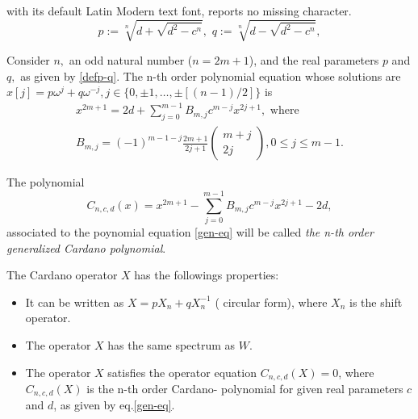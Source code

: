 \documentclass[10pt,a4paper]{amsart}
\begin{document}
with its default Latin Modern text font, reports no missing character.
\begin{equation}\label{defp-q}
    p:=\sqrt[n]{d+\sqrt{d^2-c^n}} ,\,\, q:=\sqrt[n]{d-\sqrt{d^2-c^n}},\end{equation}

\begin{theorem} Consider $n,$ an odd natural number ($n=2m+1 $), and the real parameters $p$ and $q,$ as given by \eqref{defp-q}.
 The n-th order polynomial equation whose solutions are $x[j]=p\omega^j+q\omega^{-j}, j\in\{0,\pm1,\ldots, \pm [(n-1)/2]\}$ is
 \begin{eqnarray}
x^{2m+1}=2d+\sum\limits_{j=0}^{m-1}B_{m,j}c^{m-j}x^{2j+1}, \text{ where }\label{gen-eq}
\\ B_{m,j}=(-1)^{m-1-j}\frac{2m+1}{2j+1}\begin{pmatrix}
        m+j\\2j
    \end{pmatrix}, 0\leq j\leq m-1.
    \label{B}
\end{eqnarray}

      The polynomial \begin{equation}\label{Car-pol}
          C_{n,c,d}(x)=x^{2m+1}-\sum\limits_{j=0}^{m-1}B_{m,j}c^{m-j}x^{2j+1}-2d,
      \end{equation} associated to the poynomial equation \eqref{gen-eq}  will be called \textit{the n-th order generalized Cardano   polynomial}.
\end{theorem}

\begin{proposition}\label{th-X}
  The Cardano operator $X$ has the followings properties:  
  \begin{itemize}
      \item[a)] It can be written as $X=pX_n+qX_n^{-1}$ ( circular form),  where $X_n$ is the shift operator.
      \item[b)] The operator $X$ has the same spectrum as $W$.
      \item[c)] The operator $X$ satisfies the operator equation $C_{n,c,d}(X)=0$, where $C_{n,c,d}(X)$ is the n-th order Cardano- polynomial for  given real parameters $c$ and $d$, as given by eq.\eqref{gen-eq}.
      \end{itemize}
\end{proposition}
\end{document}
